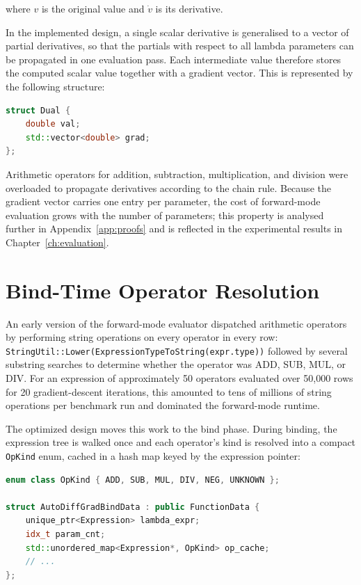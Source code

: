 \documentclass[12pt]{report}
\begin{document}
where \(v\) is the original value and \(\dot{v}\) is its derivative.

In the implemented design, a single scalar derivative is generalised to a vector of partial derivatives, so that the partials with respect to all lambda parameters can be propagated in one evaluation pass. Each intermediate value therefore stores the computed scalar value together with a gradient vector. This is represented by the following structure:

\begin{lstlisting}[language=C++]
struct Dual {
    double val;
    std::vector<double> grad;
};
\end{lstlisting}

Arithmetic operators for addition, subtraction, multiplication, and division were overloaded to propagate derivatives according to the chain rule. Because the gradient vector carries one entry per parameter, the cost of forward-mode evaluation grows with the number of parameters; this property is analysed further in Appendix~\ref{app:proofs} and is reflected in the experimental results in Chapter~\ref{ch:evaluation}.


\section{Bind-Time Operator Resolution}

An early version of the forward-mode evaluator dispatched arithmetic
operators by performing string operations on every operator in every
row: \texttt{StringUtil::Lower(ExpressionTypeToString(expr.type))} followed
by several substring searches to determine whether the operator was
ADD, SUB, MUL, or DIV. For an expression of approximately 50 operators
evaluated over 50{,}000 rows for 20 gradient-descent iterations, this
amounted to tens of millions of string operations per benchmark run
and dominated the forward-mode runtime.

The optimized design moves this work to the bind phase. During binding,
the expression tree is walked once and each operator's kind is resolved
into a compact \texttt{OpKind} enum, cached in a hash map keyed by the
expression pointer:

\begin{lstlisting}[language=C++]
enum class OpKind { ADD, SUB, MUL, DIV, NEG, UNKNOWN };

struct AutoDiffGradBindData : public FunctionData {
    unique_ptr<Expression> lambda_expr;
    idx_t param_cnt;
    std::unordered_map<Expression*, OpKind> op_cache;
    // ...
};
\end{lstlisting}
\end{document}
